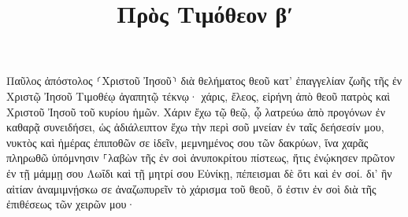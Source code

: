 \documentclass{openreader}
\title{Πρὸς Τιμόθεον βʹ}
\date{}
\begin{document}
\maketitle
\raggedbottom 
\fontsize{16pt}{24pt}\selectfont


Παῦλος ἀπόστολος ⸂Χριστοῦ Ἰησοῦ⸃ διὰ θελήματος θεοῦ κατ’ ἐπαγγελίαν ζωῆς τῆς ἐν Χριστῷ Ἰησοῦ 
Τιμοθέῳ ἀγαπητῷ τέκνῳ· χάρις, ἔλεος, εἰρήνη ἀπὸ θεοῦ πατρὸς καὶ Χριστοῦ Ἰησοῦ τοῦ κυρίου ἡμῶν. 
Χάριν ἔχω τῷ θεῷ, ᾧ λατρεύω ἀπὸ προγόνων ἐν καθαρᾷ συνειδήσει, ὡς ἀδιάλειπτον ἔχω τὴν περὶ σοῦ μνείαν ἐν ταῖς δεήσεσίν μου, νυκτὸς καὶ ἡμέρας 
ἐπιποθῶν σε ἰδεῖν, μεμνημένος σου τῶν δακρύων, ἵνα χαρᾶς πληρωθῶ 
ὑπόμνησιν ⸀λαβὼν τῆς ἐν σοὶ ἀνυποκρίτου πίστεως, ἥτις ἐνῴκησεν πρῶτον ἐν τῇ μάμμῃ σου Λωΐδι καὶ τῇ μητρί σου Εὐνίκῃ, πέπεισμαι δὲ ὅτι καὶ ἐν σοί. 
δι’ ἣν αἰτίαν ἀναμιμνῄσκω σε ἀναζωπυρεῖν τὸ χάρισμα τοῦ θεοῦ, ὅ ἐστιν ἐν σοὶ διὰ τῆς ἐπιθέσεως τῶν χειρῶν μου· 
\end{document}
